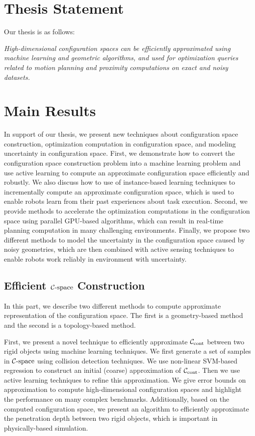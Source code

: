 \section{Thesis Statement}

Our thesis is as follows:

\textit{High-dimensional configuration spaces can be efficiently approximated using machine learning and geometric algorithms, and used for optimization queries related to motion planning and proximity computations on exact and noisy datasets.}

\section{Main Results}
In support of our thesis, we present new techniques about configuration space construction, optimization computation in configuration space, and modeling uncertainty in configuration space. First, we demonstrate how to convert the configuration space construction problem into a machine learning problem and use active learning to compute an approximate configuration space efficiently and robustly. We also discuss how to use of instance-based learning techniques to incrementally compute an approximate configuration space, which is used to enable robots learn from their past experiences about task execution. Second, we provide methods to accelerate the optimization computations in the configuration space using parallel GPU-based algorithms, which can result in real-time planning computation in many challenging environments. Finally, we propose two different methods to model the uncertainty in the configuration space caused by noisy geometries, which are then combined with active sensing techniques to enable robots work reliably in environment with uncertainty.

\subsection{Efficient $\mathcal C\text{-space}$ Construction}
In this part, we describe two different methods to compute approximate representation of the configuration space. The first is a geometry-based method and the second is a topology-based method.

First, we present a novel technique to efficiently approximate $\mathcal C_\text{cont}$ between two rigid objects using machine learning techniques. We first generate a set of samples in $\mathcal C\text{-space}$ using collision detection techniques. We use non-linear SVM-based regression to construct an initial (coarse) approximation of $\mathcal C_\text{cont}$. Then we use active learning techniques to refine this approximation. We give error bounds on approximation to compute high-dimensional configuration
spaces and highlight the performance on many complex benchmarks. Additionally, based on the computed configuration space, we present an algorithm to efficiently approximate the penetration depth between two rigid objects, which is important in physically-based simulation.

